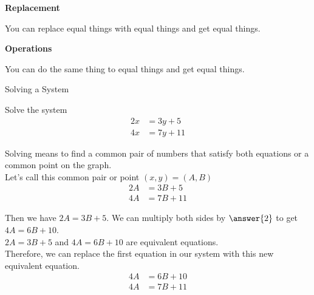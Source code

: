 \documentclass{ximera}
\begin{document}
\begin{fact} \textbf{\textcolor{purple!85!blue}{Replacement}} 

You can replace equal things with equal things and get equal things.

\end{fact}


\begin{fact} \textbf{\textcolor{purple!85!blue}{Operations}} 

You can do the same thing to equal things and get equal things.

\end{fact}






\begin{example} Solving a System


Solve the system
\begin{align*}
2x & = 3y + 5 \\
4x & = 7y + 11
\end{align*}



\begin{explanation}

Solving means to find a common pair of numbers that satisfy both equations or a common point on the graph. \\

Let's call this common pair or point $(x, y) = (A, B)$ \\

\begin{align*}
2A & = 3B + 5 \\
4A & = 7B + 11
\end{align*}



Then we have $2A = 3B + 5$. We can multiply both sides by $\answer{2}$ to get $4A = 6B + 10$.  \\

$2A = 3B + 5$ and $4A = 6B + 10$ are equivalent equations. \\

Therefore, we can replace the first equation in our system with this new equivalent equation.\\



\begin{align*}
4A & = 6B + 10 \\
4A & = 7B + 11
\end{align*}



\end{explanation}
\end{example}
\end{document}
